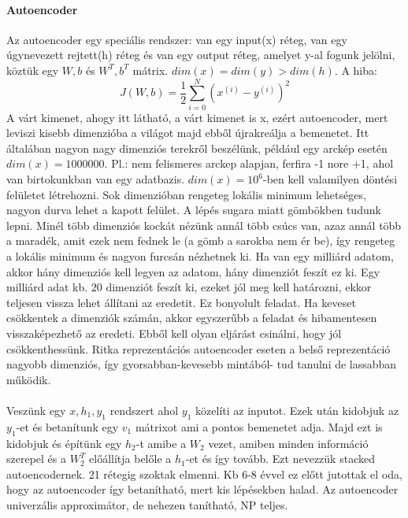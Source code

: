 \documentclass[10pt,a4paper]{report}
\begin{document}
\paragraph{Autoencoder}
Az autoencoder egy speciális rendszer: van egy input(x) réteg, van egy úgynevezett rejtett(h) réteg és van egy output réteg, amelyet y-al fogunk jelölni, köztük egy $ W,b$ és $W^T,b^T$ mátrix. $dim(x) = dim(y) > dim(h)$. A hiba:
\begin{equation}
J(W,b) = \frac{1}{2}\sum_{i=0}^N (x^{(i)}-y^{(i)})^2
\end{equation}
A várt kimenet, ahogy itt látható, a várt kimenet is x, ezért autoencoder, mert leviszi kisebb dimenzióba a világot majd ebből újrakreálja a bemenetet. Itt általában nagyon nagy dimenziós terekről beszélünk, például egy arckép esetén $dim(x) = 1 000 000.$ Pl.: nem felismeres arckep alapjan, ferfira -1 nore +1, ahol van birtokunkban van egy adatbazis. $ dim(x) = 10^6$-ben kell valamilyen döntési felületet létrehozni. Sok dimenzióban rengeteg lokális minimum lehetséges, nagyon durva lehet a kapott felület. A lépés sugara miatt gömbökben tudunk lepni. Minél több dimenziós kockát nézünk annál több csúcs van, azaz annál több a maradék, amit ezek nem fednek le (a gömb a sarokba nem ér be), így rengeteg a lokális minimum és nagyon furcsán nézhetnek ki. Ha van egy milliárd adatom, akkor hány dimenziós kell legyen az adatom, hány dimenziót feszít ez ki. Egy milliárd adat kb. 20 dimenziót feszít ki, ezeket jól meg kell határozni, ekkor teljesen vissza lehet állítani az eredetit. Ez bonyolult feladat. Ha keveset csökkentek a dimenziók számán, akkor egyszerűbb a feladat és hibamentesen visszaképezhető az eredeti. Ebből kell olyan eljárást csinálni, hogy jól csökkenthessünk.
Ritka reprezentációs autoencoder eseten a belső reprezentáció nagyobb dimenziós, így gyorsabban-kevesebb mintából- tud tanulni de lassabban működik.
\paragraph{}
Veszünk egy $x, h_1, y_1$ rendszert ahol $y_1$ közelíti az inputot. Ezek után kidobjuk az $y_1$-et és betanítunk egy $v_1$ mátrixot ami a pontos bemenetet adja. Majd ezt is kidobjuk és építünk egy $h_2$-t amibe a $W_2$ vezet, amiben minden információ szerepel és a $W_2^T$ előállítja belőle a $h_1$-et és így tovább. Ezt nevezzük stacked autoencodernek. 21 rétegig szoktak elmenni. Kb 6-8 évvel ez előtt jutottak el oda, hogy az autoencoder így betanítható, mert kis lépésekben halad. Az autoencoder univerzális approximátor, de nehezen tanítható, NP teljes. 
\end{document}

